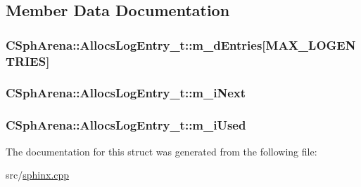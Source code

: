 \subsection{Member Data Documentation}
\hypertarget{structCSphArena_1_1AllocsLogEntry__t_a0afb0c2d78e1453192d8d3f2f8a167a0}{
\subsubsection[{m\-\_\-d\-Entries}]{ C\-Sph\-Arena\-::\-Allocs\-Log\-Entry\-\_\-t\-::m\-\_\-d\-Entries\mbox{[}{\bf M\-A\-X\-\_\-\-L\-O\-G\-E\-N\-T\-R\-I\-E\-S}\mbox{]}}}\label{structCSphArena_1_1AllocsLogEntry__t_a0afb0c2d78e1453192d8d3f2f8a167a0}
\hypertarget{structCSphArena_1_1AllocsLogEntry__t_a1e8b8b4b338d1313f70cb1ba8f83e96b}{
\subsubsection[{m\-\_\-i\-Next}]{ C\-Sph\-Arena\-::\-Allocs\-Log\-Entry\-\_\-t\-::m\-\_\-i\-Next}}\label{structCSphArena_1_1AllocsLogEntry__t_a1e8b8b4b338d1313f70cb1ba8f83e96b}
\hypertarget{structCSphArena_1_1AllocsLogEntry__t_aa7105b091bb1f93bcb3375dc6d255044}{
\subsubsection[{m\-\_\-i\-Used}]{ C\-Sph\-Arena\-::\-Allocs\-Log\-Entry\-\_\-t\-::m\-\_\-i\-Used}}\label{structCSphArena_1_1AllocsLogEntry__t_aa7105b091bb1f93bcb3375dc6d255044}


The documentation for this struct was generated from the following file\-:\begin{DoxyCompactItemize}
\item 
src/\hyperlink{sphinx_8cpp}{sphinx.\-cpp}\end{DoxyCompactItemize}
